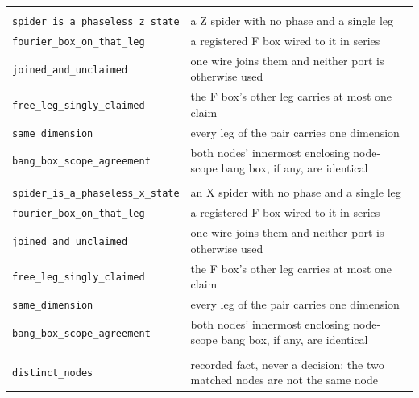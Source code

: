 \begin{xltabular}{\textwidth}{@{}>{\raggedright\arraybackslash}p{0.42\textwidth}>{\raggedright\arraybackslash}X@{}}
\midrule
{}\\
\quad\texttt{spider\_\allowbreak{}is\_\allowbreak{}a\_\allowbreak{}phaseless\_\allowbreak{}z\_\allowbreak{}state} & a Z spider with no phase and a single leg \\
\quad\texttt{fourier\_\allowbreak{}box\_\allowbreak{}on\_\allowbreak{}that\_\allowbreak{}leg} & a registered F box wired to it in series \\
\quad\texttt{joined\_\allowbreak{}and\_\allowbreak{}unclaimed} & one wire joins them and neither port is otherwise used \\
\quad\texttt{free\_\allowbreak{}leg\_\allowbreak{}singly\_\allowbreak{}claimed} & the F box's other leg carries at most one claim \\
\quad\texttt{same\_\allowbreak{}dimension} & every leg of the pair carries one dimension \\
\quad\texttt{bang\_\allowbreak{}box\_\allowbreak{}scope\_\allowbreak{}agreement} & both nodes' innermost enclosing node-scope bang box, if any, are identical \\
\midrule
{}\\
\quad\texttt{spider\_\allowbreak{}is\_\allowbreak{}a\_\allowbreak{}phaseless\_\allowbreak{}x\_\allowbreak{}state} & an X spider with no phase and a single leg \\
\quad\texttt{fourier\_\allowbreak{}box\_\allowbreak{}on\_\allowbreak{}that\_\allowbreak{}leg} & a registered F box wired to it in series \\
\quad\texttt{joined\_\allowbreak{}and\_\allowbreak{}unclaimed} & one wire joins them and neither port is otherwise used \\
\quad\texttt{free\_\allowbreak{}leg\_\allowbreak{}singly\_\allowbreak{}claimed} & the F box's other leg carries at most one claim \\
\quad\texttt{same\_\allowbreak{}dimension} & every leg of the pair carries one dimension \\
\quad\texttt{bang\_\allowbreak{}box\_\allowbreak{}scope\_\allowbreak{}agreement} & both nodes' innermost enclosing node-scope bang box, if any, are identical \\
\midrule
{}\\
\quad\texttt{distinct\_\allowbreak{}nodes} & recorded fact, never a decision: the two matched nodes are not the same node \\

\end{xltabular}
